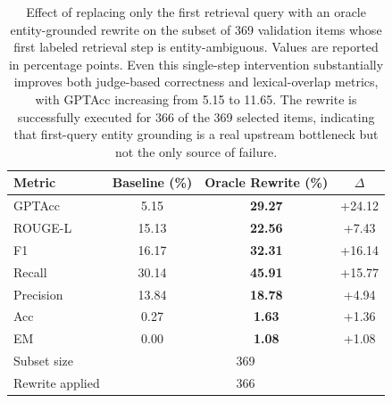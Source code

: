 \begin{table}[t]
\centering
\small
\setlength{\tabcolsep}{7pt}
\caption{Effect of replacing only the first retrieval query with an oracle entity-grounded rewrite on the subset of 369 validation items whose first labeled retrieval step is entity-ambiguous. Values are reported in percentage points. Even this single-step intervention substantially improves both judge-based correctness and lexical-overlap metrics, with GPTAcc increasing from 5.15 to 11.65. The rewrite is successfully executed for 366 of the 369 selected items, indicating that first-query entity grounding is a real upstream bottleneck but not the only source of failure.}
\label{tab:first-round-oracle-rewrite}
\begin{tabular}{lccc}
\toprule
Metric & Baseline (\%) & Oracle Rewrite (\%) & $\Delta$ \\
\midrule
GPTAcc & 5.15 & \textbf{29.27} & +24.12 \\
ROUGE-L & 15.13 & \textbf{22.56} & +7.43 \\
F1 & 16.17 & \textbf{32.31} & +16.14 \\
Recall & 30.14 & \textbf{45.91} & +15.77 \\
Precision & 13.84 & \textbf{18.78} & +4.94 \\
Acc & 0.27 & \textbf{1.63} & +1.36 \\
EM & 0.00 & \textbf{1.08} & +1.08 \\
\midrule
Subset size & \multicolumn{3}{c}{369} \\
Rewrite applied & \multicolumn{3}{c}{366} \\
\bottomrule
\end{tabular}
\end{table}
